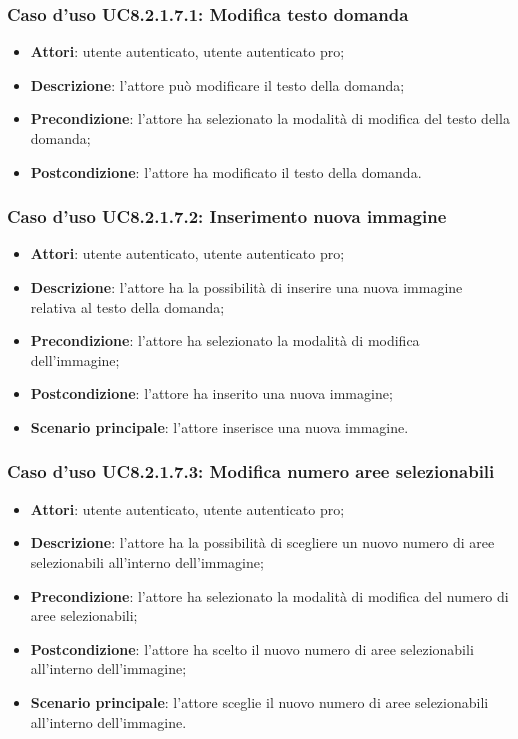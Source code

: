 \subsubsection{Caso d'uso UC8.2.1.7.1: Modifica testo domanda}
\begin{itemize}
	\item \textbf{Attori}: utente autenticato, utente autenticato pro;
	\item \textbf{Descrizione}: l'attore può modificare il testo della domanda;
	\item \textbf{Precondizione}: l'attore ha selezionato la modalità di modifica del testo della domanda;
	\item \textbf{Postcondizione}: l'attore ha modificato il testo della domanda.
\end{itemize}

\subsubsection{Caso d'uso UC8.2.1.7.2: Inserimento nuova immagine}
\begin{itemize}
	\item \textbf{Attori}: utente autenticato, utente autenticato pro;
	\item \textbf{Descrizione}: l'attore ha la possibilità di inserire una nuova immagine relativa al testo della domanda;
	\item \textbf{Precondizione}: l'attore ha selezionato la modalità di modifica dell'immagine; 
	\item \textbf{Postcondizione}: l'attore ha inserito una nuova immagine;
	\item \textbf{Scenario principale}: l'attore inserisce una nuova immagine. 	
\end{itemize}

\subsubsection{Caso d'uso UC8.2.1.7.3: Modifica numero aree selezionabili}
\begin{itemize}
	\item \textbf{Attori}: utente autenticato, utente autenticato pro;
	\item \textbf{Descrizione}: l'attore ha la possibilità di scegliere un nuovo numero di aree selezionabili all'interno dell'immagine;
	\item \textbf{Precondizione}: l'attore ha selezionato la modalità di modifica del numero di aree selezionabili; 
	\item \textbf{Postcondizione}: l'attore ha scelto il nuovo numero di aree selezionabili all'interno dell'immagine;
	\item \textbf{Scenario principale}: l'attore sceglie il nuovo numero di aree selezionabili all'interno dell'immagine. 	
\end{itemize}

